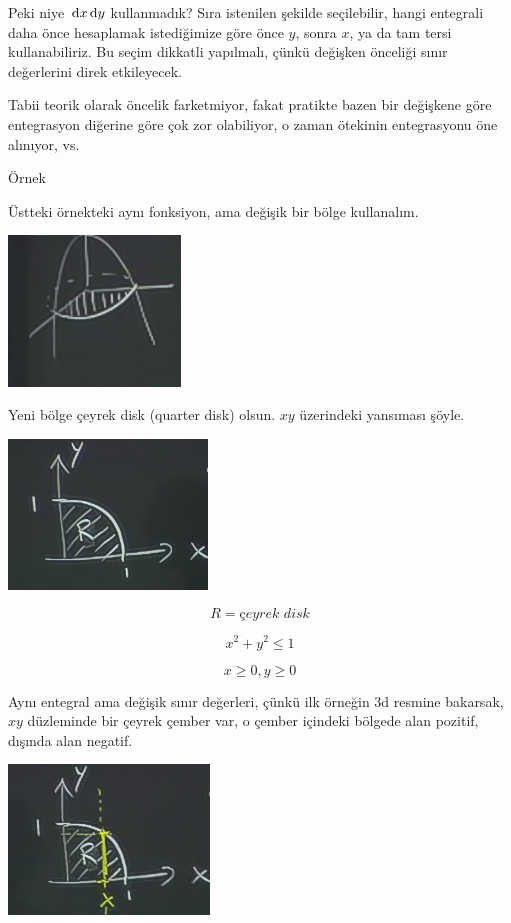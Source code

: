 \documentclass[12pt,fleqn]{article}\usepackage{../../common}
\begin{document}
Peki niye $\,\mathrm{d} x \,\mathrm{d} y$ kullanmadık? Sıra istenilen şekilde seçilebilir, hangi
entegrali daha önce hesaplamak istediğimize göre önce $y$, sonra $x$, ya da
tam tersi kullanabiliriz. Bu seçim dikkatli yapılmalı, çünkü değişken
önceliği sınır değerlerini direk etkileyecek. 

Tabii teorik olarak öncelik farketmiyor, fakat pratikte bazen bir değişkene
göre entegrasyon diğerine göre çok zor olabiliyor, o zaman ötekinin
entegrasyonu öne alınıyor, vs.

Örnek

Üstteki örnekteki aynı fonksiyon, ama değişik bir bölge kullanalım. 

\includegraphics[height=4cm]{16_9.png}

Yeni bölge çeyrek disk (quarter disk) olsun. $xy$ üzerindeki yansıması
şöyle. 

\includegraphics[height=4cm]{16_10.png}

$$ R = \textit{çeyrek disk}  $$

$$ x^2 + y^2 \le 1 $$

$$ x \ge 0, y \ge 0 $$

Aynı entegral ama değişik sınır değerleri, çünkü ilk örneğin 3d resmine
bakarsak, $xy$ düzleminde bir çeyrek çember var, o çember içindeki bölgede
alan pozitif, dışında alan negatif. 

\includegraphics[height=4cm]{16_11.png}
\end{document}

